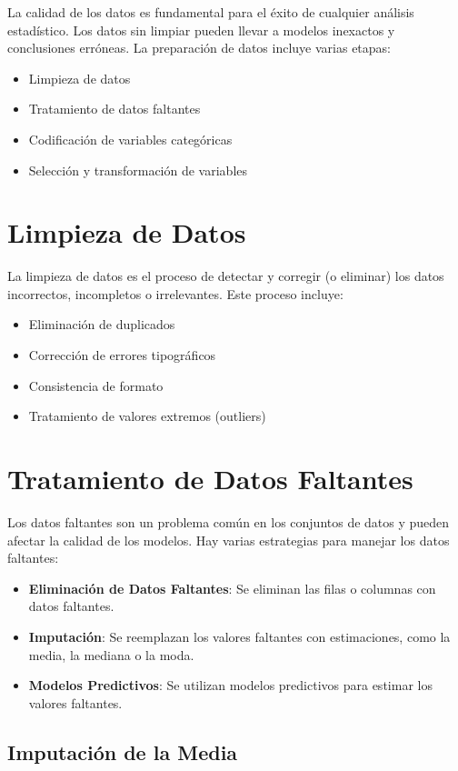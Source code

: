 \documentclass[a4paper]{report} %
\begin{document}
La calidad de los datos es fundamental para el \'exito de cualquier an\'alisis estad\'istico. Los datos sin limpiar pueden llevar a modelos inexactos y conclusiones err\'oneas. La preparaci\'on de datos incluye varias etapas:
\begin{itemize}
    \item Limpieza de datos
    \item Tratamiento de datos faltantes
    \item Codificaci\'on de variables categ\'oricas
    \item Selecci\'on y transformaci\'on de variables
\end{itemize}

\section{Limpieza de Datos}

La limpieza de datos es el proceso de detectar y corregir (o eliminar) los datos incorrectos, incompletos o irrelevantes. Este proceso incluye:
\begin{itemize}
    \item Eliminaci\'on de duplicados
    \item Correcci\'on de errores tipogr\'aficos
    \item Consistencia de formato
    \item Tratamiento de valores extremos (outliers)
\end{itemize}

\section{Tratamiento de Datos Faltantes}

Los datos faltantes son un problema com\'un en los conjuntos de datos y pueden afectar la calidad de los modelos. Hay varias estrategias para manejar los datos faltantes:
\begin{itemize}
    \item \textbf{Eliminaci\'on de Datos Faltantes}: Se eliminan las filas o columnas con datos faltantes.
    \item \textbf{Imputaci\'on}: Se reemplazan los valores faltantes con estimaciones, como la media, la mediana o la moda.
    \item \textbf{Modelos Predictivos}: Se utilizan modelos predictivos para estimar los valores faltantes.
\end{itemize}

\subsection{Imputaci\'on de la Media}
\end{document}
